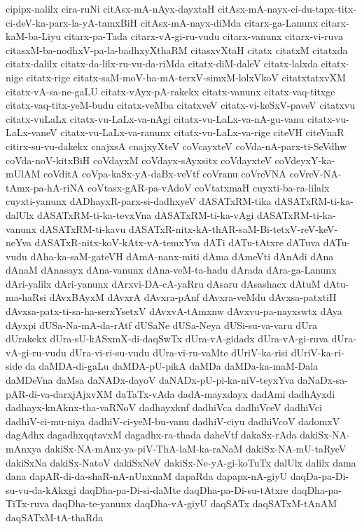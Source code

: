 {cipipx-nalilx
cira-ruNi
citAsx-mA-nAyx-dayxtaH
citAsx-mA-nayx-ci-du-tapx-titx-ci-deV-ka-parx-la-yA-tamxBiH
citAsx-mA-nayx-diMda
citarx-ga-Lanunx
citarx-kaM-ba-Liyu
citarx-pa-Tada
citarx-vA-gi-ru-vudu
citarx-vanunx
citarx-vi-ruva
citasxM-ba-nodhxV-pa-la-badhxyXthaRM
citasxvXtaH
citatx
citatxM
citatxda
citatx-dalilx
citatx-da-lilx-ru-vu-da-riMda
citatx-diM-daleV
citatx-lalxda
citatx-nige
citatx-rige
citatx-saM-moV-ha-mA-terxV-simxM-lolxVkoV
citatxtatxvXM
citatx-vA-sa-ne-gaLU
citatx-vAyx-pA-rakekx
citatx-vanunx
citatx-vaq-titxge
citatx-vaq-titx-yeM-budu
citatx-veMba
citatxveV
citatx-vi-keSxV-paveV
citatxvu
citatx-vuLaLx
citatx-vu-LaLx-va-nAgi
citatx-vu-LaLx-va-nA-gu-vanu
citatx-vu-LaLx-vaneV
citatx-vu-LaLx-va-ranunx
citatx-vu-LaLx-va-rige
citeVH
citeVnaR
citirx-su-vu-dakekx
cnajxsA
cnajxyXteV
coVcayxteV
coVda-nA-parx-ti-SeVdhw
coVda-noV-kitxBiH
coVdayxM
coVdayx-sAyxsitx
coVdayxteV
coVdeyxY-ka-mUlAM
coVditA
coVpa-kaSx-yA-daBx-veVtf
coVranu
coVreVNA
coVreV-NA-tAmx-pa-hA-riNA
coVtasx-gAR-pa-vAdoV
coVtatxmaH
cuyxti-ba-ra-lilalx
cuyxti-yanunx
dADhayxR-parx-si-dadhxyeV
dASATxRM-tika
dASATxRM-ti-ka-dalUlx
dASATxRM-ti-ka-tevxVna
dASATxRM-ti-ka-vAgi
dASATxRM-ti-ka-vanunx
dASATxRM-ti-kavu
dASATxR-nitx-kA-thAR-saM-Bi-tetxV-reV-keV-neYva
dASATxR-nitx-koV-kAtx-vA-temxYva
dATi
dATu-tAtxre
dATuva
dATu-vudu
dAha-ka-saM-gateVH
dAmA-nanx-miti
dAma
dAmeVti
dAnAdi
dAna
dAnaM
dAnasayx
dAna-vanunx
dAna-veM-ta-hadu
dArada
dAra-ga-Lanunx
dAri-yalilx
dAri-yanunx
dArxvi-DA-cA-yaRru
dAsaru
dAsashacx
dAtuM
dAtu-ma-haRsi
dAvxBAyxM
dAvxrA
dAvxra-pAnf
dAvxra-veMdu
dAvxsa-patxtiH
dAvxsa-patx-ti-sa-ha-serxYsetxV
dAvxvA-tAmxnw
dAvxvu-pa-nayxswtx
dAya
dAyxpi
dUSa-Na-mA-da-rAtf
dUSaNe
dUSa-Neya
dUSi-su-va-varu
dUra
dUrakekx
dUra-sU-kASxmX-di-daqSwTx
dUra-vA-gidadx
dUra-vA-gi-ruva
dUra-vA-gi-ru-vudu
dUra-vi-ri-su-vudu
dUra-vi-ru-vaMte
dUriV-ka-risi
dUriV-ka-ri-side
da
daMDA-di-gaLu
daMDA-pU-pikA
daMDa
daMDa-ka-maM-Dala
daMDeVna
daMsa
daNADx-dayoV
daNADx-pU-pi-ka-niV-teyxYva
daNaDx-sa-pAR-di-va-darxjAjxvXM
daTaTx-vAda
dadA-mayxdayx
dadAmi
dadhAyxdi
dadhayx-knAknx-tha-vaRNoV
dadhayxknf
dadhiVca
dadhiVceV
dadhiVci
dadhiV-ci-mu-niya
dadhiV-ci-yeM-bu-vanu
dadhiV-ciyu
dadhiVcoV
dadomxV
dagAdhx
dagadhxqqtavxM
dagadhx-ra-thada
daheVtf
dakaSx-rAda
dakiSx-NA-mAnxya
dakiSx-NA-mAnx-ya-piV-ThA-laM-ka-raNaM
dakiSx-NA-mU-taRyeV
dakiSxNa
dakiSx-NatoV
dakiSxNeV
dakiSx-Ne-yA-gi-koTuTx
dalUlx
dalilx
dama
dana
dapAR-di-da-shaR-nA-nUnxnaM
dapaRda
dapapx-nA-giyU
daqDa-pa-Di-su-vu-da-kAkxgi
daqDha-pa-Di-si-daMte
daqDha-pa-Di-su-tAtxre
daqDha-pa-TiTx-ruva
daqDha-te-yanunx
daqDha-vA-giyU
daqSATx
daqSATxM-tAnAM
daqSATxM-tA-thaRda
}
